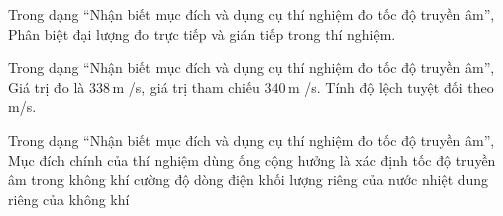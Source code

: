 \begin{ex}
Trong dạng “Nhận biết mục đích và dụng cụ thí nghiệm đo tốc độ truyền âm”, Phân biệt đại lượng đo trực tiếp và gián tiếp trong thí nghiệm.
\choiceTF

\end{ex}

\begin{ex}
Trong dạng “Nhận biết mục đích và dụng cụ thí nghiệm đo tốc độ truyền âm”, Giá trị đo là $338\,\text{m}$ /s, giá trị tham chiếu $340\,\text{m}$ /s. Tính độ lệch tuyệt đối theo m/s.
\end{ex}

\begin{ex}
Trong dạng “Nhận biết mục đích và dụng cụ thí nghiệm đo tốc độ truyền âm”, Mục đích chính của thí nghiệm dùng ống cộng hưởng là xác định
\choice
{\True tốc độ truyền âm trong không khí}
{cường độ dòng điện}
{khối lượng riêng của nước}
{nhiệt dung riêng của không khí}
\end{ex}

